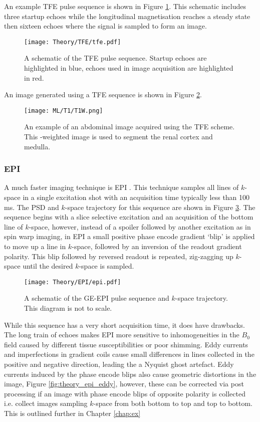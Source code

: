 An example \ac{TFE} pulse sequence is shown in Figure \ref{fig:theory_tfe_psd}. This schematic includes three startup echoes while the longitudinal magnetisation reaches a steady state then sixteen echoes where the signal is sampled to form an image.
\begin{figure}[H]
	\centering
	\texttt{[image: Theory/TFE/tfe.pdf]}
	\caption{A schematic of the \ac{TFE} pulse sequence. Startup echoes are highlighted in blue, echoes used in image acquisition are highlighted in red.}
	\label{fig:theory_tfe_psd}
\end{figure}
An image generated using a \ac{TFE} sequence is shown in Figure \ref{fig:theory_tfe_example}.
\begin{figure}[H]
	\centering
	\texttt{[image: ML/T1/T1W.png]}
	\caption{An example of an abdominal image acquired using the \ac{TFE} scheme. This \tone-weighted image is used to segment the renal cortex and medulla.}
	\label{fig:theory_tfe_example}	
\end{figure}

\subsubsection{\ac*{EPI}}
A much faster imaging technique is \ac{EPI} \cite{mansfield_nmr_1973}. This technique samples all lines of $k$-space in a single excitation shot with an acquisition time typically less than 100 ms. The \ac{PSD} and $k$-space trajectory for this sequence are shown in Figure \ref{fig:theory_epi}. The sequence begins with a slice selective excitation and an acquisition of the bottom line of $k$-space, however, instead of a spoiler followed by another excitation as in spin warp imaging, in \ac{EPI} a small positive phase encode gradient `blip' is applied to move up a line in $k$-space, followed by an inversion of the readout gradient polarity. This blip followed by reversed readout is repeated, zig-zagging up $k$-space until the desired $k$-space is sampled.

\begin{figure}[H]
	\centering
	\texttt{[image: Theory/EPI/epi.pdf]}
	\caption{A schematic of the \ac{GE}-\ac{EPI} pulse sequence and $k$-space trajectory. This diagram is not to scale.}
	\label{fig:theory_epi}	
\end{figure}

While this sequence has a very short acquisition time, it does have drawbacks. The long train of echoes makes \ac{EPI} more sensitive to inhomogeneities in the $B_0$ field caused by different tissue susceptibilities or poor shimming. Eddy currents and imperfections in gradient coils cause small differences in lines collected in the positive and negative direction, leading the a Nyquist ghost artefact. Eddy currents induced by the phase encode blips also cause geometric distortions in the image, Figure \ref{fig:theory_epi_eddy}, however, these can be corrected via post processing if an image with phase encode blips of opposite polarity is collected i.e. collect images sampling $k$-space from both bottom to top and top to bottom. This is outlined further in Chapter \ref{chap:ex}

